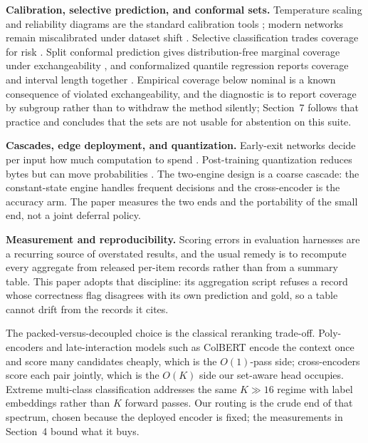 \documentclass[11pt]{article}
\begin{document}
\textbf{Calibration, selective prediction, and conformal sets.}
Temperature scaling and reliability diagrams are the standard calibration tools
\citep{guo2017calibration}; modern networks remain miscalibrated under dataset shift
\citep{ovadia2019uncertainty}. Selective classification trades coverage for risk
\citep{geifman2017selective,geifman2019selectivenet}. Split conformal prediction gives
distribution-free marginal coverage under exchangeability
\citep{lei2018distribution,angelopoulos2021gentle}, and conformalized quantile regression reports
coverage and interval length together \citep{romano2019cqr}. Empirical coverage below nominal is a
known consequence of violated exchangeability, and the diagnostic is to report coverage by
subgroup rather than to withdraw the method silently; Section~7 follows that
practice and concludes that the sets are not usable for abstention on this suite.

\textbf{Cascades, edge deployment, and quantization.}
Early-exit networks decide per input how much computation to spend
\citep{teerapittayanon2016branchynet,xin2020fastbert,zhou2020deebert}. Post-training quantization
reduces bytes but can move probabilities
\citep{dettmers2022llmint8,frantar2023gptq,xiao2023smoothquant}. The two-engine design is a coarse
cascade: the constant-state engine handles frequent decisions and the cross-encoder is the
accuracy arm. The paper measures the two ends and the portability of the small end, not a joint
deferral policy.

\textbf{Measurement and reproducibility.}
Scoring errors in evaluation harnesses are a recurring source of overstated results, and the
usual remedy is to recompute every aggregate from released per-item records rather than from a
summary table. This paper adopts that discipline: its aggregation script refuses a record whose
correctness flag disagrees with its own prediction and gold, so a table cannot drift from the
records it cites.

The packed-versus-decoupled choice is the classical reranking trade-off. Poly-encoders
\citep{humeau2020poly} and late-interaction models such as ColBERT \citep{khattab2020colbert} encode
the context once and score many candidates cheaply, which is the $O(1)$-pass side; cross-encoders
score each pair jointly, which is the $O(K)$ side our set-aware head occupies. Extreme
multi-class classification addresses the same $K\gg16$ regime with label embeddings rather than
$K$ forward passes. Our routing is the crude end of that spectrum, chosen because the deployed
encoder is fixed; the measurements in Section~4 bound what it buys.
\end{document}

